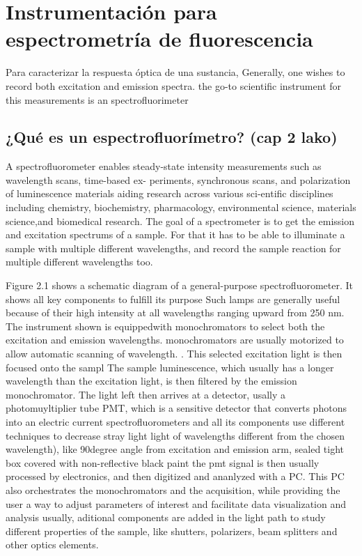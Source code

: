 
\section{Instrumentación para espectrometría de fluorescencia}

Para caracterizar la respuesta óptica de una sustancia, Generally, one wishes to record both excitation and emission spectra.
the go-to scientific instrument for this measurements is an spectrofluorimeter

\subsection{¿Qué es un espectrofluorímetro? (cap 2 lako)}

A spectrofluorometer enables steady-state intensity measurements such as wavelength scans, time-based ex- periments, synchronous scans, and polarization of luminescence materials aiding research across various sci-entific disciplines including chemistry, biochemistry, pharmacology, environmental science, materials science,and biomedical research. 
The goal of a spectrometer is to get the emission and excitation spectrums of a sample.
For that it has to be able to illuminate a sample with multiple different wavelengths, and record the sample reaction for multiple different wavelengths too.

Figure 2.1 shows a schematic diagram of a general-purpose spectrofluorometer.
It shows all key components to fulfill its purpose
Such lamps are generally useful because of their high intensity at all wavelengths ranging upward from 250 nm. 
The instrument shown is equippedwith monochromators to select both the excitation and emission wavelengths.
monochromators are usually motorized to allow automatic scanning of wavelength.
. This selected excitation light is then focused onto the sampl
The sample luminescence, which usually has a longer wavelength than the excitation light, is then filtered by the emission monochromator.
The light left then arrives at a detector, usally a photomuyltiplier tube PMT, which is a sensitive detector that converts photons into an electric current
spectrofluorometers and all its components use different techniques to decrease stray light light of wavelengths different from the chosen wavelength), like 90degree angle from excitation and emission arm, sealed tight box covered with non-reflective black paint
the pmt signal is then usually processed by electronics, and then digitized and ananlyzed with a PC. 
This PC also orchestrates the monochromators and the acquisition, while providing the user a way to adjust parameters of interest and facilitate data visualization and analysis
usually, aditional components are added in the light path to study different properties of the sample, like shutters, polarizers, beam splitters and other optics elements.



